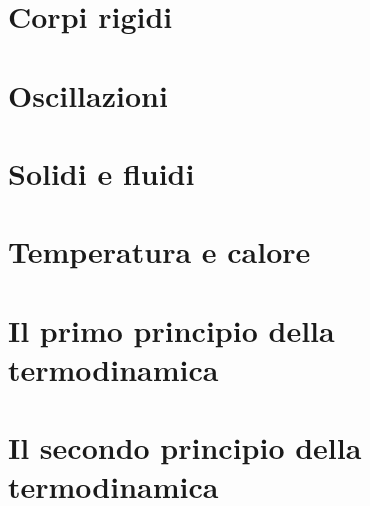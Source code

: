 \documentclass[a4paper]{extarticle}
\begin{document}
\newpage
\section{Corpi rigidi}

\newpage
\section{Oscillazioni}

\newpage
\section{Solidi e fluidi}

\newpage
\section{Temperatura e calore}

\newpage
\section{Il primo principio della termodinamica}

\newpage
\section{Il secondo principio della termodinamica}
\end{document}
